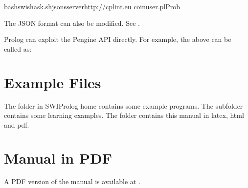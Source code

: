 \documentclass[letterpaper,10pt,english]{sphinxmanual}
\begin{document}
\begin{sphinxVerbatim}[commandchars=\\\{\}]
bashswish\PYGZhy{}ask.sh\PYGZhy{}\PYGZhy{}json\PYGZhy{}s\PYGZhy{}\PYGZhy{}serverhttp://cplint.eu
coin\PYGZus{}user.plProb
\end{sphinxVerbatim}

\sphinxAtStartPar
The JSON format can also be modified.
See .

\sphinxAtStartPar
Prolog can exploit the Pengine API directly. For example, the above can be called as:

\begin{sphinxVerbatim}[commandchars=\\\{\}]
 \PYG{p}{[}\PYG{p}{]}
 
        \PYG{p}{[} 
\PYG{p}{]}

  
\end{sphinxVerbatim}


\chapter{Example Files}
\label{\detokenize{index:example-files}}
\sphinxAtStartPar
The  folder in SWI\sphinxhyphen{}Prolog home contains some example programs.
The subfolder  contains some learning examples.
The  folder contains this manual in latex, html and pdf.


\chapter{Manual in PDF}
\label{\detokenize{index:manual-in-pdf}}
\sphinxAtStartPar
A PDF version of the manual is available at .
\end{document}

